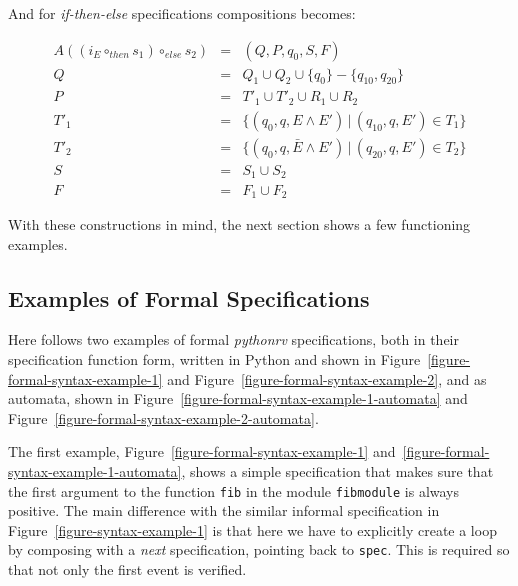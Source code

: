 And for \textit{if-then-else} specifications compositions becomes:

\medskip
\[
  \begin{array}{rcl}
  A((i_E \circ_{then} s_1) \circ_{else} s_2) & = & (Q, P, q_0, S, F) \\
                                           Q & = & Q_1 \cup Q_2 \cup \{q_0\} - \{q_{10}, q_{20}\} \\
                                           P & = & T'_1 \cup T'_2 \cup R_1 \cup R_2 \\
                                        T'_1 & = & \{(q_0, q, E       \wedge E') \, | \, (q_{10}, q, E') \in T_1\} \\
                                        T'_2 & = & \{(q_0, q, \bar{E} \wedge E') \, | \, (q_{20}, q, E') \in T_2\} \\
                                           S & = & S_1 \cup S_2 \\
                                           F & = & F_1 \cup F_2
  \end{array}
\]
\medskip

With these constructions in mind, the next section shows a few functioning
examples.


\subsection{Examples of Formal Specifications}
\label{section-approach-examples-of-formal-specifications}
\lstset{language=Python,numbers=none}

Here follows two examples of formal \textit{pythonrv} specifications, both in
their specification function form, written in Python and shown in
Figure~\ref{figure-formal-syntax-example-1} and
Figure~\ref{figure-formal-syntax-example-2}, and as automata, shown in
Figure~\ref{figure-formal-syntax-example-1-automata} and
Figure~\ref{figure-formal-syntax-example-2-automata}.

The first example, Figure~\ref{figure-formal-syntax-example-1}
and~\ref{figure-formal-syntax-example-1-automata}, shows a simple specification
that makes sure that the first argument to the function \texttt{fib} in the
module \texttt{fibmodule} is always positive. The main difference with the
similar informal specification in Figure~\ref{figure-syntax-example-1} is that
here we have to explicitly create a loop by composing with a \textit{next}
specification, pointing back to \texttt{spec}. This is required so that not
only the first event is verified.

